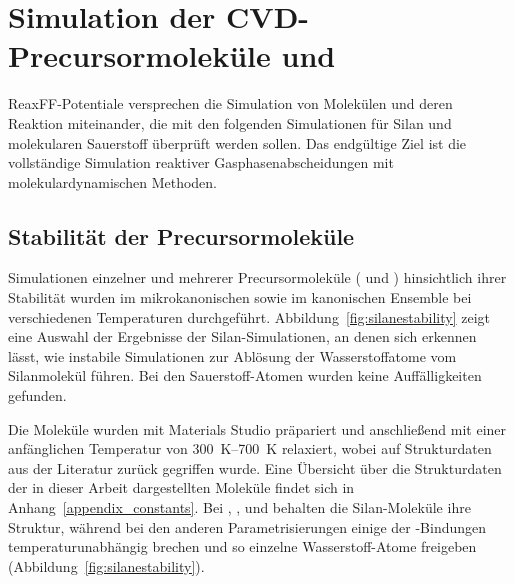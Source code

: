 \chapter{Simulation der CVD-Precursormoleküle \texorpdfstring{}{Silan} und \texorpdfstring{}{Sauerstoff}}
\label{appendix_silica}

ReaxFF-Potentiale versprechen die Simulation von Molekülen und deren Reaktion miteinander, die mit den folgenden Simulationen für Silan und molekularen Sauerstoff überprüft werden sollen.
Das endgültige Ziel ist die vollständige Simulation reaktiver Gasphasenabscheidungen mit molekulardynamischen Methoden.

\section{Stabilität der Precursormoleküle}

Simulationen einzelner und mehrerer Precursormoleküle ( und ) hinsichtlich ihrer Stabilität wurden im mikrokanonischen sowie im kanonischen Ensemble bei verschiedenen Temperaturen durchgeführt.
Abbildung~\ref{fig:silanestability} zeigt eine Auswahl der Ergebnisse der Silan-Simulationen, an denen sich erkennen lässt, wie instabile Simulationen zur Ablösung der Wasserstoffatome vom Silanmolekül führen.
Bei den Sauerstoff-Atomen wurden keine Auffälligkeiten gefunden.

Die Moleküle wurden mit Materials Studio\cite{biovia_materials_2014} präpariert und anschließend mit einer anfänglichen Temperatur von \SIrange{300}{700}{\kelvin} relaxiert, wobei auf Strukturdaten aus der Literatur zurück gegriffen wurde\cite{haynes_crc_2011}.
Eine Übersicht über die Strukturdaten der in dieser Arbeit dargestellten Moleküle findet sich in Anhang~\ref{appendix_constants}.
Bei , ,  und  behalten die Silan-Moleküle ihre Struktur, während bei den anderen Parametrisierungen einige der -Bindungen temperaturunabhängig brechen und so einzelne Wasserstoff-Atome freigeben (Abbildung~\ref{fig:silanestability}).

